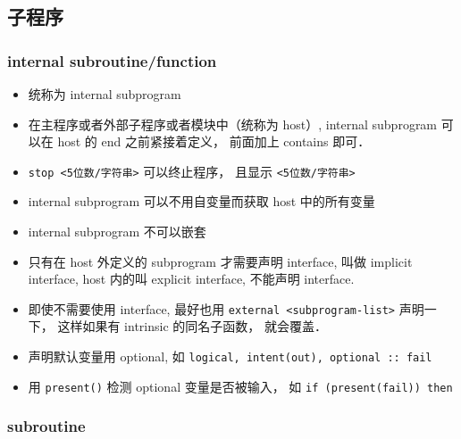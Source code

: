 \subsection{子程序}
\subsubsection{internal subroutine/function}
\begin{itemize}
\item 统称为 internal subprogram
\item 在主程序或者外部子程序或者模块中（统称为 host）, internal subprogram 可以在 host 的 end 之前紧接着定义， 前面加上 contains 即可．
\item \verb|stop <5位数/字符串>| 可以终止程序， 且显示 \verb|<5位数/字符串>|
\item internal subprogram 可以不用自变量而获取 host 中的所有变量
\item internal subprogram 不可以嵌套
\item 只有在 host 外定义的 subprogram 才需要声明 interface, 叫做 implicit interface, host 内的叫 explicit interface, 不能声明 interface.
\item 即使不需要使用 interface, 最好也用 \verb|external <subprogram-list>| 声明一下， 这样如果有 intrinsic 的同名子函数， 就会覆盖．
\item 声明默认变量用 optional, 如 \verb|logical, intent(out), optional :: fail|
\item 用 \verb|present()| 检测 optional 变量是否被输入， 如 \verb|if (present(fail)) then|
\end{itemize}

\subsubsection{subroutine}

